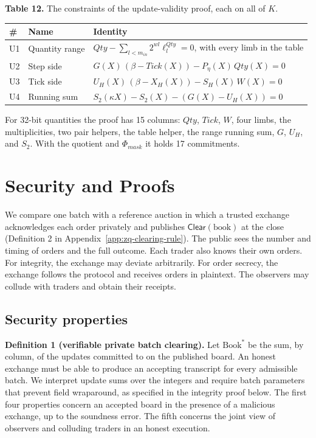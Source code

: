 \textbf{Table 12.} The constraints of the update-validity proof, each on all of \(K\).

\begin{longtable}[]{@{}lll@{}}
\toprule\noalign{}
\# & Name & Identity \\
\midrule\noalign{}
\endhead
\bottomrule\noalign{}
\endlastfoot
U1 & Quantity range & \(Qty - \sum_{l<m_{in}} 2^{wl} \ell^{Qty}_l = 0\), with every limb in the table \\
U2 & Step side & \(G(X)\,(\beta - Tick(X)) - P_\eta(X)\,Qty(X) = 0\) \\
U3 & Tick side & \(U_H(X)\,(\beta - X_H(X)) - S_H(X)\,W(X) = 0\) \\
U4 & Running sum & \(S_2(\kappa X) - S_2(X) - (G(X) - U_H(X)) = 0\) \\
\end{longtable}

For 32-bit quantities the proof has 15 columns: \(Qty\), \(Tick\), \(W\), four limbs, the multiplicities, two pair helpers, the table helper, the range running sum, \(G\), \(U_H\), and \(S_2\). With the quotient and \(\Phi_{mask}\) it holds 17 commitments.


\section{Security and Proofs}
\label{app:zq-security}

We compare one batch with a reference auction in which a trusted exchange acknowledges each order privately and publishes \(\mathsf{Clear}(\mathrm{book})\) at the close (Definition 2 in Appendix~\ref{app:zq-clearing-rule}). The public sees the number and timing of orders and the full outcome. Each trader also knows their own orders. For integrity, the exchange may deviate arbitrarily. For order secrecy, the exchange follows the protocol and receives orders in plaintext. The observers may collude with traders and obtain their receipts.

\subsection{Security properties}

\textbf{Definition 1 (verifiable private batch clearing).} Let \(\mathrm{Book}^*\) be the sum, by column, of the updates committed to on the published board. An honest exchange must be able to produce an accepting transcript for every admissible batch. We interpret update sums over the integers and require batch parameters that prevent field wraparound, as specified in the integrity proof below. The first four properties concern an accepted board in the presence of a malicious exchange, up to the soundness error. The fifth concerns the joint view of observers and colluding traders in an honest execution.

